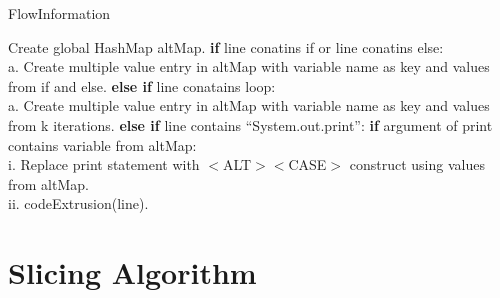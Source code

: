 \documentclass[11pt]{article}   %
\begin{document}
\begin{algorithm}
\caption{FlowInformation}
\begin{algorithmic}[1]
\State Create global HashMap altMap.
\State \textbf{if} line conatins if or line conatins else:\\
\hspace{2cm}a. Create multiple value entry in altMap with variable name as key and values from if and else.
\State \textbf{else if} line conatains loop:\\
\hspace{2cm}a. Create multiple value entry in altMap with variable name as key and values from k iterations.
\State \textbf{else if} line contains “System.out.print”:
\State \hspace{2cm} \textbf{if} argument of print contains variable from altMap:\\
\hspace{4cm}i. Replace print statement with $<$ALT$><$CASE$>$ construct using values from altMap.\\
\hspace{4cm}ii. codeExtrusion(line).

\end{algorithmic}
\end{algorithm}
\section{Slicing Algorithm}
\end{document}
